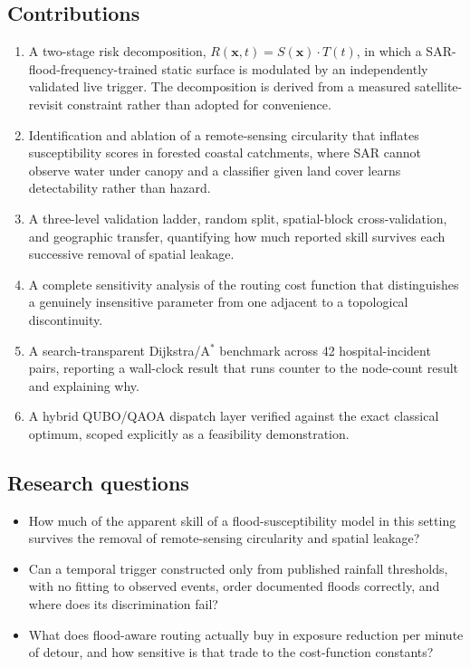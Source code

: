 \documentclass[11pt,a4paper]{article}
\newcommand{\Sx}{S(\mathbf{x})}
\newcommand{\Tt}{T(t)}
\newcommand{\Rxt}{R(\mathbf{x},t)}
\begin{document}
\subsection{Contributions}
\begin{enumerate}
\itemsep2pt
\item A two-stage risk decomposition, $\Rxt=\Sx\cdot\Tt$, in which a
      SAR-flood-frequency-trained static surface is modulated by an independently
      validated live trigger. The decomposition is derived from a measured
      satellite-revisit constraint rather than adopted for convenience.
\item Identification and ablation of a remote-sensing circularity that inflates
      susceptibility scores in forested coastal catchments, where SAR cannot
      observe water under canopy and a classifier given land cover learns
      detectability rather than hazard.
\item A three-level validation ladder, random split, spatial-block
      cross-validation, and geographic transfer, quantifying how much reported
      skill survives each successive removal of spatial leakage.
\item A complete sensitivity analysis of the routing cost function that
      distinguishes a genuinely insensitive parameter from one adjacent to a
      topological discontinuity.
\item A search-transparent Dijkstra/A$^\ast$ benchmark across 42
      hospital-incident pairs, reporting a wall-clock result that runs counter to
      the node-count result and explaining why.
\item A hybrid QUBO/QAOA dispatch layer verified against the exact classical
      optimum, scoped explicitly as a feasibility demonstration.
\end{enumerate}

\subsection{Research questions}
\begin{itemize}
\itemsep1pt
\item[\textbf{RQ1}] How much of the apparent skill of a flood-susceptibility
      model in this setting survives the removal of remote-sensing circularity
      and spatial leakage?
\item[\textbf{RQ2}] Can a temporal trigger constructed only from published
      rainfall thresholds, with no fitting to observed events, order documented
      floods correctly, and where does its discrimination fail?
\item[\textbf{RQ3}] What does flood-aware routing actually buy in exposure
      reduction per minute of detour, and how sensitive is that trade to the
      cost-function constants?
\end{itemize}
\end{document}
